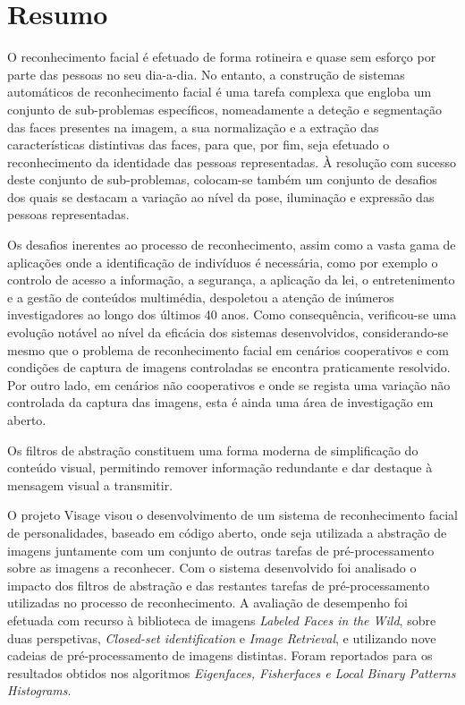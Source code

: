 \chapter*{Resumo}
O reconhecimento facial é efetuado de forma rotineira e quase sem esforço por parte das pessoas no seu dia-a-dia. No entanto, a construção de sistemas automáticos de reconhecimento facial é uma tarefa complexa que engloba um conjunto de sub-problemas específicos, nomeadamente a deteção e segmentação das faces presentes na imagem, a sua normalização e a extração das características distintivas das faces, para que, por fim, seja efetuado o reconhecimento da identidade das pessoas representadas. À resolução com sucesso deste conjunto de sub-problemas, colocam-se também um conjunto de desafios dos quais se destacam a variação ao nível da pose, iluminação e expressão das pessoas representadas.

Os desafios inerentes ao processo de reconhecimento, assim como a vasta gama de aplicações onde a identificação de indivíduos é necessária, como por exemplo o controlo de acesso a informação, a segurança, a aplicação da lei, o entretenimento e a gestão de conteúdos multimédia, despoletou a atenção de inúmeros investigadores ao longo dos últimos 40 anos. Como consequência, verificou-se uma evolução notável ao nível da eficácia dos sistemas desenvolvidos, considerando-se mesmo que o problema de reconhecimento facial em cenários cooperativos e com condições de captura de imagens controladas se encontra praticamente resolvido. Por outro lado, em cenários não cooperativos e onde se regista uma variação não controlada da captura das imagens, esta é ainda uma área de investigação em aberto. 

Os filtros de abstração constituem uma forma moderna de simplificação do conteúdo visual, permitindo remover informação redundante e dar destaque à mensagem visual a transmitir.

O projeto Visage visou o desenvolvimento de um sistema de reconhecimento facial de personalidades, baseado em código aberto, onde seja utilizada a abstração de imagens juntamente com um conjunto de outras tarefas de pré-processamento sobre as imagens a reconhecer. Com o sistema desenvolvido foi analisado o impacto dos filtros de abstração e das restantes tarefas de pré-processamento utilizadas no processo de reconhecimento. A avaliação de desempenho foi efetuada com recurso à biblioteca de imagens \textit{Labeled Faces in the Wild}, sobre duas perspetivas, \textit{Closed-set identification} e \textit{Image Retrieval}, e utilizando nove cadeias de pré-processamento de imagens distintas. Foram reportados para os resultados obtidos nos algoritmos \textit{Eigenfaces, Fisherfaces e Local Binary Patterns Histograms}.

